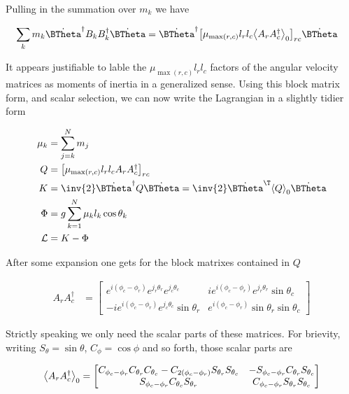Pulling in the summation over $m_k$ we have

\begin{align}\label{eqn:multiPendulumSpherical2:boo15}
\sum_k m_k
\dot{\BTheta}^\dagger
B_k B_k^\dagger
\dot{\BTheta}
&=
\dot{\BTheta}^\dagger
{\begin{bmatrix}
\mu_{\max(r,c)} l_r l_c \gpgradezero{A_r A_c^\dagger}
\end{bmatrix}}_{rc}
\dot{\BTheta}
\end{align}

It appears justifiable to lable the $\mu_{\max(r,c)} l_r l_c$ factors of the angular velocity matrices as moments of inertia in a generalized sense.  Using this block matrix form, and scalar selection, we can now write the Lagrangian in a slightly tidier form

\begin{align}\label{eqn:multiPendulumSpherical2:boo5}
\mu_k &= \sum_{j=k}^N m_j \\
Q &= 
{\begin{bmatrix}
\mu_{\max(r,c)} l_r l_c A_r A_c^\dagger
\end{bmatrix}}_{rc} \\
K &=
\inv{2} \dot{\BTheta}^\dagger Q
\dot{\BTheta} 
=\inv{2} \dot{\BTheta}^\T \gpgradezero{Q}
\dot{\BTheta} \\
\Phi &=
g \sum_{k=1}^N \mu_k l_k \cos\theta_k \\
\LL &= K - \Phi
\end{align}

After some expansion one gets for the block matrixes contained in $Q$

\begin{align}\label{eqn:multiPendulumSpherical2:boo12}
A_r A_c^\dagger
&=
\begin{bmatrix}
e^{i(\phi_c - \phi_r)} e^{j_r \theta_r} e^{j_c \theta_c} & i e^{i(\phi_c - \phi_r)} e^{j_r \theta_r} \sin\theta_c \\
-i e^{i(\phi_c - \phi_r)} e^{j_c \theta_c} \sin\theta_r  & e^{i(\phi_c - \phi_r)} \sin\theta_r \sin\theta_c
\end{bmatrix}
\end{align}

Strictly speaking we only need the scalar parts of these matrices.  For brievity, writing $S_\theta = \sin\theta$, $C_\phi = \cos\phi$ and so forth, those scalar parts are

\begin{align}\label{eqn:multiPendulumSpherical2:boo20}
{\left\langle{{A_r A_c^\dagger}}\right\rangle}_{0}
=
\begin{bmatrix}
C_{\phi_c - \phi_r} 
C_{\theta_r}
C_{\theta_c}
-C_{2(\phi_c - \phi_r)} 
S_{\theta_r}
S_{\theta_c} &
-S_{\phi_c - \phi_r} C_{\theta_r} S_{\theta_c} \\
S_{\phi_c - \phi_r} C_{\theta_c} S_{\theta_r} &
C_{\phi_c - \phi_r} S_{\theta_r} S_{\theta_c}
\end{bmatrix}
\end{align}

